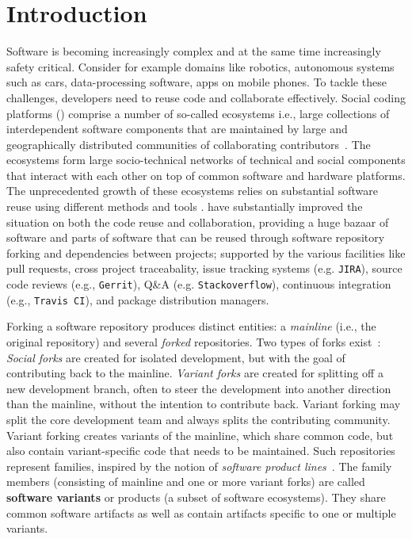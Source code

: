 \section{Introduction}
Software is becoming increasingly complex and at the same time increasingly safety critical.
Consider for example domains like robotics, autonomous systems such as cars, data-processing software, apps on mobile phones.
To tackle these challenges, developers need to reuse code and collaborate effectively.
Social coding platforms (\scp) comprise a number of so-called ecosystems i.e., large collections of interdependent software components that are maintained by large and geographically distributed communities of collaborating contributors~\cite{lungu:2008,decan:2017}. 
The ecosystems form large socio-technical networks of technical and social components that interact with each other on top of common software and hardware platforms.
The unprecedented growth of these ecosystems relies on substantial software reuse using different methods and tools \cite{mojica2014large}. 
\scp have substantially improved the situation on both the code reuse and collaboration, providing a huge bazaar of software and parts of software that can be reused through software repository forking and dependencies between projects; supported by the various facilities like pull requests, cross project traceabality, issue tracking systems (e.g. \texttt{JIRA}), source code reviews (e.g., \texttt{Gerrit}), Q\&A (e.g. \texttt{Stackoverflow}), continuous integration (e.g., \texttt{Travis CI}), and package distribution managers.




Forking a software repository produces distinct entities: a \textit{mainline} (i.e., the original repository) and several \textit{forked} repositories.
Two types of forks exist~\cite{Zhou:2020}: \textit{Social forks} are created for isolated development, but with the goal of contributing back to the mainline.
\textit{Variant forks} are created for splitting off a new development branch, often to steer the development into another direction than the mainline, without the intention to contribute back.
Variant forking may split the core development team and always splits the contributing community.
Variant forking creates variants of the mainline, which share common code, but also contain variant-specific code that needs to be maintained.
Such repositories represent families, inspired by the notion of \textit{software product lines}~\cite{berger.ea:2020:emse}.
The family members (consisting of mainline and one or more variant forks) are called \textbf{software variants} or products (a subset of software ecosystems).
They share common software artifacts as well as contain artifacts specific to one or multiple variants. 

